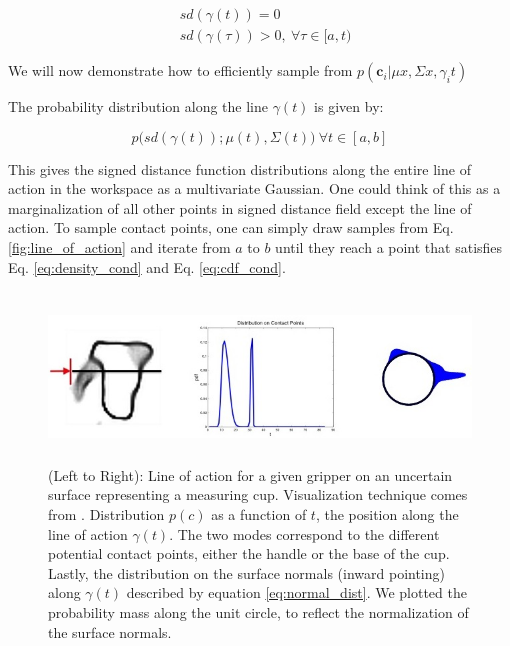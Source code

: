 \documentclass[letterpaper, 10 pt, conference]{ieeeconf}  %
\begin{document}
\vspace{-2ex}
\begin{align}
 &sd(\gamma(t)) = 0 \label{eq:density_cond} \\
&sd(\gamma(\tau)) > 0, \: \forall \tau \in [a,t) \label{eq:cdf_cond}
\end{align}

We will now demonstrate how to efficiently sample from $p(\textbf{c}_i|\mu{x},\Sigma{x},\gamma_i{t})$

The probability distribution along the line $\gamma(t)$ is given by:

\vspace{-2ex}
\begin{equation} \label{eq:line_of_act_dist}
p\big(sd(\gamma(t)) ; \mu(t),\Sigma(t)\big) \ \forall t \in [a,b] 
\end{equation}

This gives the signed distance function distributions along the entire line of action in the workspace as a multivariate Gaussian. One could think of this as a marginalization of all other points in signed distance field except the line of action. To sample contact points, one can simply draw samples from Eq. \ref{fig:line_of_action} and iterate from $a$ to $b$ until they reach a point that satisfies  Eq. \ref{eq:density_cond} and Eq. \ref{eq:cdf_cond}. 

\begin{figure}[ht!]
\centering
\includegraphics[width = 17cm, height = 4.5cm]{figures/Slide04.jpg}
\caption{ \footnotesize (Left to Right): Line of action for a given gripper on an uncertain surface representing a measuring cup. Visualization technique comes from \cite{mahler2015opt}. Distribution $p(c)$ as a function of $t$, the position along the line of action $\gamma(t)$. The two modes correspond to the different potential contact points, either the handle or the base of the cup. Lastly, the distribution on the surface normals (inward pointing) along $\gamma(t)$ described by equation \ref{eq:normal_dist}. We plotted the probability mass along the unit circle, to reflect the normalization of the surface normals. }
\vspace*{-10pt}
\label{fig:GraspDist}
\end{figure}
\end{document}
